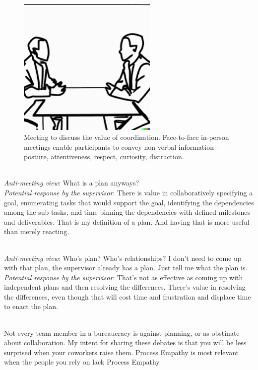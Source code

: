 \begin{figure}%
    \centering
\includegraphics[width=0.6\textwidth,trim={0 .6cm 0 1cm},clip]{images/confrontational_meeting_of_two_people_in_a_conference_room_both_are_seated.pdf}
    \caption{Meeting to discuss the value of coordination. Face-to-face in-person meetings enable participants to convey non-verbal information -- posture, attentiveness, respect, curiosity, distraction.}
    \label{fig:meeting-to-discuss-coordination}
\end{figure}


\ \\
\textit{Anti-meeting view}: What is a plan anyways?\\
\textit{Potential response by the supervisor}: There is value in collaboratively specifying a goal, enumerating tasks that would support the goal, identifying the dependencies among the sub-tasks, and time-binning the dependencies with defined milestones and deliverables. That is my definition of a plan. And having that is more useful than merely reacting.

\ \\
\textit{Anti-meeting view}: Who's plan? Who's relationships? I don't need to come up with that plan, the supervisor already has a plan. Just tell me what the plan is.\\
\textit{Potential response by the supervisor}: That's not as effective as coming up with independent plans and then resolving the differences. There's value in resolving the differences, even though that will cost time and frustration and displace time to enact the plan.


\ \\

Not every team member in a bureaucracy is against planning, or as obstinate about collaboration. 
My intent for sharing these debates is that you will be less surprised when your coworkers raise them. Process Empathy is most relevant when the people you rely on lack Process Empathy.
